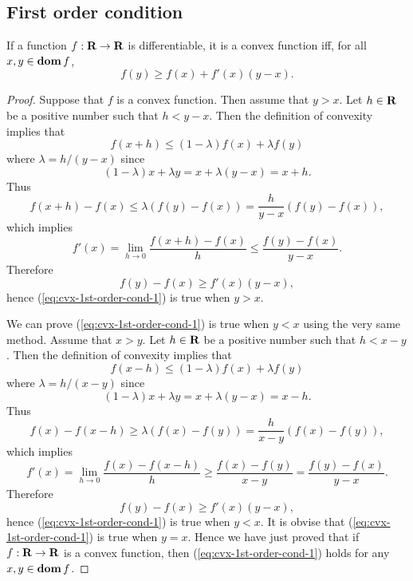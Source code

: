 \documentclass[10pt, twoside]{book}   	%
\begin{document}
\subsection{First order condition}

\begin{theorem}
\label{theorem:cvx-1st-order-cond-1}
If a function $f:{\mbox{\bf R}}\to{\mbox{\bf R}}$ is differentiable, it is a convex function iff, for all $x, y \in \mathop{\bf dom} f$,
\begin{equation}
\label{eq:cvx-1st-order-cond-1}
        f(y) \geq f(x) + f'(x) (y-x).
\end{equation}
\end{theorem}

\begin{proof}
Suppose that $f$ is a convex function.
Then assume that $y>x$. Let $h\in{\mbox{\bf R}}$ be a positive number such that $h<y-x$. Then the definition of convexity implies that
\[
f(x+h) \leq (1-\lambda) f(x) + \lambda f(y)
\]
where $\lambda = h/(y-x)$ since
\[
(1-\lambda) x + \lambda y = x + \lambda (y-x) = x +h.
\]
Thus
\[
f(x+h) - f (x) \leq \lambda (f(y)-f(x)) = \frac{h}{y-x} (f(y)-f(x)),
\]
which implies
\[
f'(x) = \lim_{h\to0} \frac{f(x+h) - f (x)}{h} \leq \frac{f(y)-f(x)}{y-x}.
\]
Therefore
\[
f(y) - f(x) \geq f'(x)(y-x),
\]
hence (\ref{eq:cvx-1st-order-cond-1}) is true when $y>x$.

We can prove (\ref{eq:cvx-1st-order-cond-1}) is true when $y<x$ using the very same method.
Assume that $x>y$. Let $h\in{\mbox{\bf R}}$ be a positive number such that $h<x-y$. Then the definition of convexity implies that
\[
f(x-h) \leq (1-\lambda) f(x) + \lambda f(y)
\]
where $\lambda = h/(x-y)$ since
\[
(1-\lambda) x + \lambda y = x + \lambda (y-x) = x -h.
\]
Thus
\[
f(x) - f (x-h) \geq \lambda (f(x)-f(y)) = \frac{h}{x-y} (f(x)-f(y)),
\]
which implies
\[
f'(x) = \lim_{h\to0} \frac{f(x) - f (x-h)}{h} \geq \frac{f(x)-f(y)}{x-y}  =\frac{f(y)-f(x)}{y-x}.
\]
Therefore
\[
f(y) - f(x) \geq f'(x)(y-x),
\]
hence (\ref{eq:cvx-1st-order-cond-1}) is true when $y<x$.
It is obvise that (\ref{eq:cvx-1st-order-cond-1}) is true when $y=x$.
Hence we have just proved that if $f:{\mbox{\bf R}}\to{\mbox{\bf R}}$ is a convex function, then (\ref{eq:cvx-1st-order-cond-1}) holds
for any $x,y\in\mathop{\bf dom} f$.


\end{proof}
\end{document}
